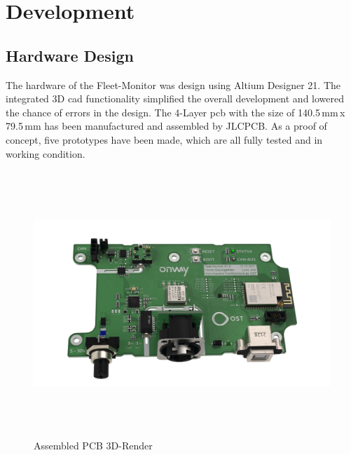 \chapter{Development}

\section{Hardware Design}
The hardware of the Fleet-Monitor was design using Altium Designer 21. The integrated 3D \acrshort{cad} functionality simplified the overall development and lowered the chance of errors in the design. The 4-Layer \acrfull{pcb} with the size of 140.5\,mm\,x\,79.5\,mm has been manufactured and assembled by JLCPCB.\newline
As a proof of concept, five prototypes have been made, which are all fully tested and in working condition.

\begin{figure}[h!]
	\hfuzz=57.0pt
	\hspace{-1.4cm}
	\includegraphics[height=10.0cm]{images/fleet-monitor-rendering-pcb}
	\caption{Assembled PCB 3D-Render}
	\label{fig:fleet-monitor-rendering-pcb}
\end{figure}
\newpage

